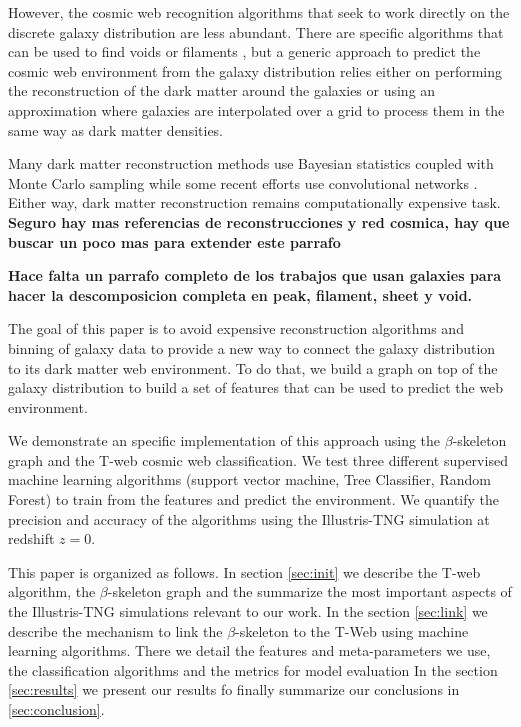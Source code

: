 \documentclass[usenatbib]{mnras}
\begin{document}
However, the cosmic web recognition algorithms that seek to work
directly on the discrete galaxy distribution are less abundant.
There are specific algorithms that can be used to find voids or
filaments \citep{2010Sousbie,2019Luber}, but a generic approach to predict the cosmic web
environment from the galaxy distribution relies either on 
performing the reconstruction of the dark matter around the galaxies
or using an approximation where galaxies are interpolated over a 
grid to process them in the same way as dark matter densities.

Many dark matter reconstruction methods use Bayesian statistics
coupled with Monte Carlo sampling
\citep{2015LeclercqJasche,2016Wang,2018Simola,2020Burchett} while some
recent efforts use convolutional networks \citep{2019Zhang}. 
Either way, dark matter reconstruction remains computationally expensive task.
{\textbf{Seguro hay mas referencias de reconstrucciones y red cosmica,
hay que buscar un poco mas para extender este parrafo}}

{\textbf{Hace falta un parrafo completo de los trabajos que usan
    galaxies para hacer la descomposicion completa en peak, filament,
    sheet y void.}}

The goal of this paper is to avoid expensive reconstruction algorithms
and binning of galaxy data to provide a new way to connect the galaxy
distribution to its dark matter web environment.
To do that, we build a graph on top of the galaxy distribution 
to build a set of features that can be used to predict the web
environment.

We demonstrate an specific implementation of this approach using 
the $\beta$-skeleton graph \citep{2019Fang} and the 
T-web \citep{2009Forero-Romero} cosmic web classification.
We test three different supervised machine learning
algorithms (support vector machine, Tree Classifier, Random Forest) 
to train from the features and predict the environment.
We quantify the precision and accuracy of the algorithms using 
the Illustris-TNG simulation at redshift $z=0$.


This paper is organized as follows. 
In section \ref{sec:init} we describe the T-web algorithm,
the $\beta$-skeleton graph and the summarize the most important
aspects of the Illustris-TNG simulations relevant to our work.
In the section \ref{sec:link} we
describe the mechanism to link the $\beta$-skeleton to the T-Web
using machine learning algorithms. 
There we detail the features and meta-parameters we use, the
classification algorithms and the metrics for model evaluation 
In the section \ref{sec:results} we present our results
fo finally summarize our conclusions in \ref{sec:conclusion}.
\end{document}
